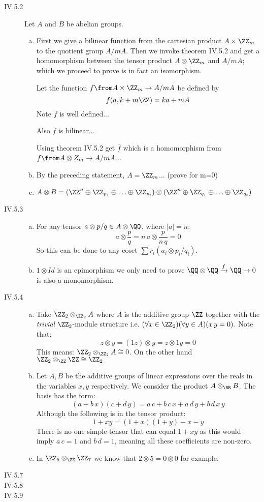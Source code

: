 \begin{description}
\item[IV.5.2] Let $A$ and $B$ be abelian groups.
\begin{enumerate}[(a)]
\item First we give a bilinear function from the cartesian product $A\times \ZZ_m$ to the quotient group $A/mA$. Then we invoke theorem IV.5.2 and get a homomorphism between the tensor product $A\otimes \ZZ_m$ and $A/mA$; which we proceed to prove is in fact an isomorphism.

    Let the function $f\from A\times \ZZ_m\to A/mA$ be defined by $$f(a,k+m\ZZ) = ka+mA$$
    Note $f$ is well defined...

    Also $f$ is bilinear...

    Using theorem IV.5.2 get $\bar f$ which is a homomorphism from $f\from A\otimes Z_m \to A/mA$...
\item By the preceding statement, $A= \ZZ_m$... (prove for m=0)
\item $A\otimes B=(\ZZ^n\oplus\ZZ_{p_1}\oplus \ldots \oplus \ZZ_{p_t})\otimes(\ZZ^n\oplus\ZZ_{q_1}\oplus \ldots \oplus \ZZ_{q_t})$
\end{enumerate}
\item[IV.5.3]
    \begin{enumerate}[(a)]
        \item For any tensor $a\otimes p/q \in A\otimes \QQ$, where $|a|=n$:
            $$a\otimes \frac pq = n\,a\otimes \frac p{n\,q} = 0$$
            So this can be done to any coset $\sum r_i(a_i\otimes p_i/q_i)$.
        \item $1\otimes Id $ is an epimorphism we only need to prove $\QQ\otimes \QQ \xrightarrow{f} \QQ \to 0$ is also a monomorphism.
    \end{enumerate}
\item[IV.5.4]
    \begin{enumerate}[(a)]
        \item Take $\ZZ_2\otimes_{\ZZ_2} A$ where $A$ is the additive group $\ZZ$ together with the \emph{trivial} $\ZZ_2$-module structure i.e. $(\forall x\in \ZZ_2)(\forall y\in A)(x\,y=0)$. Note that:
            $$z\otimes y = (1z)\otimes y = z \otimes 1y = 0$$
            This means: $\ZZ_2\otimes_{\ZZ_2} A\cong {0}$. On the other hand $\ZZ_2\otimes_{\ZZ} \ZZ\cong\ZZ_2$
        \item Let $A,B$ be the additive groups of linear expressions over the reals in the variables $x,y$ respectively. We consider the product $A\otimes_\RR B$. The basis has the form:
            $$(a+b\,x)(c+d\,y)=a\,c + b\,c\,x + a\,d\,y + b\,d\,x\,y$$
            Although the following is in the tensor product:
            $$1+xy= (1+x)(1+y) - x - y$$
            There is no one simple tensor that can equal $1+xy$ as this would imply $a\,c=1$ and $b\,d=1$, meaning all these coefficients are non-zero.
        \item In $\ZZ_5\otimes_\ZZ \ZZ_7$ we know that $2\otimes 5=0\otimes 0$ for example.
    \end{enumerate}
\item[IV.5.7]
\item[IV.5.8]
\item[IV.5.9]
\end{description}

